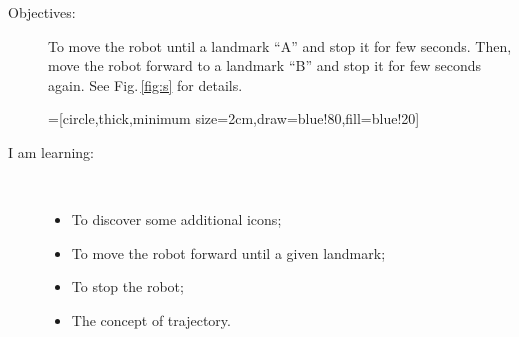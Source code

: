 \begin{flushleft}
\begin{description}
\item[Objectives:] To move the robot until a landmark ``A'' and stop it for few seconds. Then, move the robot forward to a landmark ``B'' and stop it for few seconds again. See Fig.\,\ref{fig:s} for details.
\begin{minipage}[c]{\textwidth}
\centering
{}=[circle,thick,minimum size=2cm,draw=blue!80,fill=blue!20]
\vspace{1ex}
\label{fig:s}
\end{minipage}
\item[I am learning:] \hfill \\ \vspace{-1ex}
  \begin{itemize}
  \item To discover some additional icons;
  \item To move the robot forward until a given landmark;
  \item To stop the robot;
  \item The concept of trajectory.
  \end{itemize}
\end{description}
\end{flushleft}
\frameboxend

